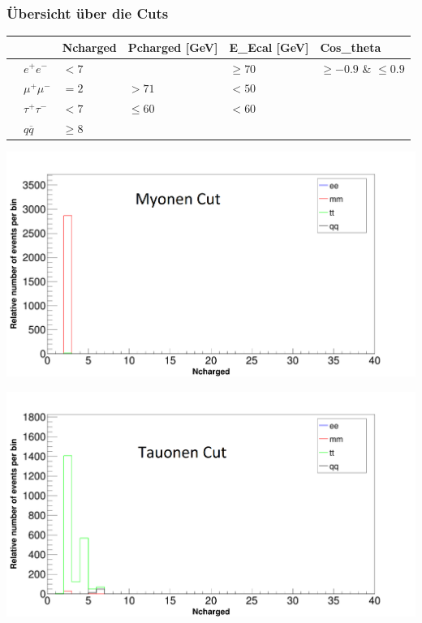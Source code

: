 \begin{frame}
	\frametitle{Übersicht über die Cuts}
	\begin{table}[H]\centering
		\begin{tabular}{@{}llllll@{}}
			\toprule
			&			&Ncharged	&Pcharged [GeV]	&E\_Ecal [GeV] &Cos\_theta\\ 
			\midrule
			&$e^+e^-$	&$<7$		&				&$\ge70$		&$\ge-0.9$ \& $\le0.9$\\
			&$\mu^+\mu^-$		&$=2$			&$>71$		&$<50$			&			\\
			&$\tau^+\tau^-$		&$<7$		&$\le60$			&$<60$			&					\\
			&$q\overline{q}$		&$\ge8$		&				&				&			\\
			\bottomrule
		\end{tabular}
	\end{table}
	\begin{minipage}{0.48\linewidth}
		\centering
		\includegraphics[width=1.1\linewidth]{graphics/Ncharged_final_mm}
	\end{minipage}
	\begin{minipage}{0.48\linewidth}
		\centering
		\includegraphics[width=1.1\linewidth]{graphics/Ncharged_final_tt}
	\end{minipage}
\end{frame}
